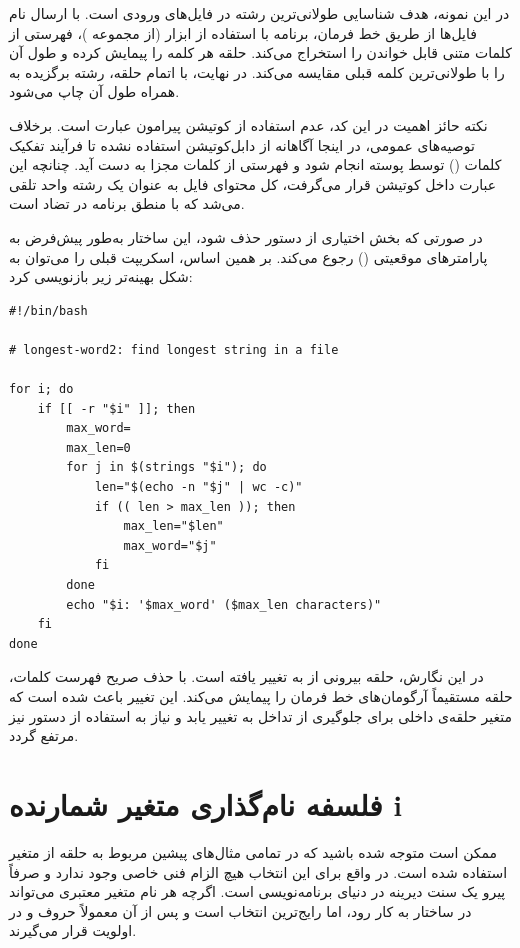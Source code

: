 در این نمونه، هدف شناسایی طولانی‌ترین رشته در فایل‌های ورودی است. با ارسال نام فایل‌ها از طریق خط فرمان، برنامه با استفاده از ابزار  (از مجموعه )، فهرستی از کلمات متنی قابل خواندن را استخراج می‌کند. حلقه  هر کلمه را پیمایش کرده و طول آن را با طولانی‌ترین کلمه قبلی مقایسه می‌کند. در نهایت، با اتمام حلقه، رشته برگزیده به همراه طول آن چاپ می‌شود.

نکته حائز اهمیت در این کد، عدم استفاده از کوتیشن پیرامون عبارت  است. برخلاف توصیه‌های عمومی، در اینجا آگاهانه از دابل‌کوتیشن استفاده نشده تا فرآیند تفکیک کلمات () توسط پوسته انجام شود و فهرستی از کلمات مجزا به دست آید. چنانچه این عبارت داخل کوتیشن قرار می‌گرفت، کل محتوای فایل به عنوان یک رشته واحد تلقی می‌شد که با منطق برنامه در تضاد است.

در صورتی که بخش اختیاری  از دستور  حذف شود، این ساختار به‌طور پیش‌فرض به پارامترهای موقعیتی () رجوع می‌کند. بر همین اساس، اسکریپت قبلی را می‌توان به شکل بهینه‌تر زیر بازنویسی کرد:

\begin{latin}
\begin{lstlisting}
#!/bin/bash

# longest-word2: find longest string in a file

for i; do
    if [[ -r "$i" ]]; then
        max_word=
        max_len=0
        for j in $(strings "$i"); do
            len="$(echo -n "$j" | wc -c)"
            if (( len > max_len )); then
                max_len="$len"
                max_word="$j"
            fi
        done
        echo "$i: '$max_word' ($max_len characters)"
    fi
done
\end{lstlisting}
\end{latin}

در این نگارش، حلقه بیرونی از  به  تغییر یافته است. با حذف صریح فهرست کلمات، حلقه  مستقیماً آرگومان‌های خط فرمان را پیمایش می‌کند. این تغییر باعث شده است که متغیر حلقه‌ی داخلی برای جلوگیری از تداخل به  تغییر یابد و نیاز به استفاده از دستور  نیز مرتفع گردد.

\section{فلسفه نام‌گذاری متغیر شمارنده i}

ممکن است متوجه شده باشید که در تمامی مثال‌های پیشین مربوط به حلقه  از متغیر  استفاده شده است. در واقع برای این انتخاب هیچ الزام فنی خاصی وجود ندارد و صرفاً پیرو یک سنت دیرینه در دنیای برنامه‌نویسی است. اگرچه هر نام متغیر معتبری می‌تواند در ساختار  به کار رود، اما  رایج‌ترین انتخاب است و پس از آن معمولاً حروف  و  در اولویت قرار می‌گیرند.

